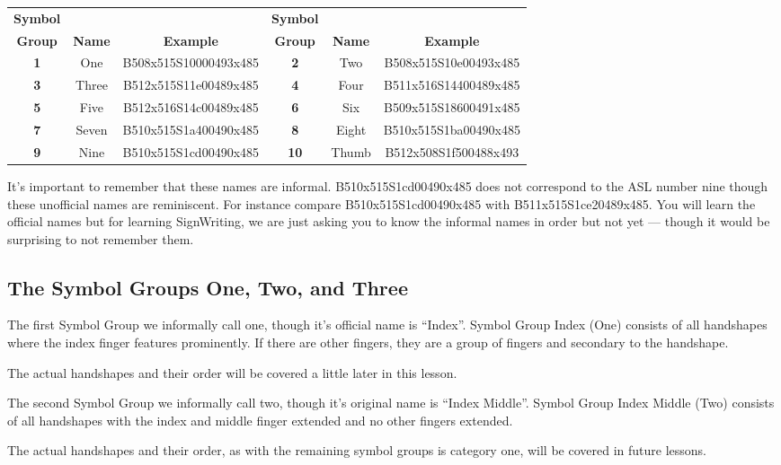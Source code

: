 \documentclass{article}
\begin{document}
\begin{center}
\begin{tabular}{ccc@{\hskip 5mm}ccc}
\textbf{Symbol}&&&\textbf{Symbol}\\
\textbf{Group}&\textbf{Name}&\textbf{Example}&\textbf{Group}&\textbf{Name}&\textbf{Example}\\
\textbf{1}&One  &B508x515S10000493x485&\textbf{2} &Two  &B508x515S10e00493x485\\
\textbf{3}&Three&B512x515S11e00489x485&\textbf{4} &Four &B511x516S14400489x485\\
\textbf{5}&Five &B512x516S14c00489x485&\textbf{6} &Six  &B509x515S18600491x485\\
\textbf{7}&Seven&B510x515S1a400490x485&\textbf{8} &Eight&B510x515S1ba00490x485\\
\textbf{9}&Nine &B510x515S1cd00490x485&\textbf{10}&Thumb&B512x508S1f500488x493\\
\end{tabular}
\end{center}

It's important to remember that these names are informal.
B510x515S1cd00490x485 does not correspond to the ASL number nine though these unofficial names are reminiscent.
For instance compare B510x515S1cd00490x485 with B511x515S1ce20489x485.
You will learn the official names but for learning SignWriting, we are just asking you to know the informal names in order but not yet --- though it would be surprising to not remember them.

\subsection{The Symbol Groups One, Two, and Three}

The first Symbol Group we informally call one, though it's official name is ``Index''.
Symbol Group Index (One) consists of all handshapes where the index finger features prominently.
If there are other fingers, they are a group of fingers and secondary to the handshape.

The actual handshapes and their order will be covered a little later in this lesson.

The second Symbol Group we informally call two, though it's original name is ``Index Middle''.
Symbol Group Index Middle (Two) consists of all handshapes with the index and middle finger extended and no other fingers extended.

The actual handshapes and their order, as with the remaining symbol groups is category one, will be covered in future lessons.
\end{document}
